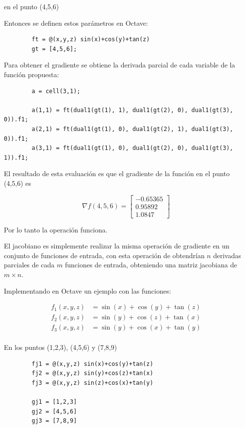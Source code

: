 \documentclass[a4paper, 12pt]{article}
\begin{document}
    en el punto (4,5,6)

    Entonces se definen estos parámetros en Octave:

    \begin{verbatim}
        ft = @(x,y,z) sin(x)+cos(y)+tan(z)
        gt = [4,5,6];
    \end{verbatim}

    Para obtener el gradiente se obtiene la derivada parcial de cada variable de la función propuesta:

    \begin{verbatim}
        a = cell(3,1);

        a(1,1) = ft(dual1(gt(1), 1), dual1(gt(2), 0), dual1(gt(3), 0)).f1;
        a(2,1) = ft(dual1(gt(1), 0), dual1(gt(2), 1), dual1(gt(3), 0)).f1;
        a(3,1) = ft(dual1(gt(1), 0), dual1(gt(2), 0), dual1(gt(3), 1)).f1;
    \end{verbatim}

    El resultado de esta evaluación es que el gradiente de la función en el punto (4,5,6) es

    \[
        \nabla f(4,5,6) = \begin{bmatrix}
            -0.65365 \\
            0.95892 \\
            1.0847
        \end{bmatrix}
    \]

    Por lo tanto la operación funciona.

    El jacobiano es simplemente realizar la misma operación de gradiente en un conjunto de funciones de entrada, con esta operación de obtendrían $n$ derivadas parciales de cada $m$ funciones de entrada, obteniendo una matriz jacobiana de $m \times n$.

    Implementando en Octave un ejemplo con las funciones:

    \begin{align*}
        f_1(x,y,z) &= \sin(x) + \cos(y)+ \tan(z) \\
        f_2(x,y,z) &= \sin(y) + \cos(z)+ \tan(x) \\
        f_3(x,y,z) &= \sin(y) + \cos(x)+ \tan(y) \\
    \end{align*}

    En los puntos (1,2,3), (4,5,6) y (7,8,9)

    \begin{verbatim}
        fj1 = @(x,y,z) sin(x)+cos(y)+tan(z)
        fj2 = @(x,y,z) sin(y)+cos(z)+tan(x)
        fj3 = @(x,y,z) sin(z)+cos(x)+tan(y)

        gj1 = [1,2,3]
        gj2 = [4,5,6]
        gj3 = [7,8,9]
    \end{verbatim}
\end{document}
